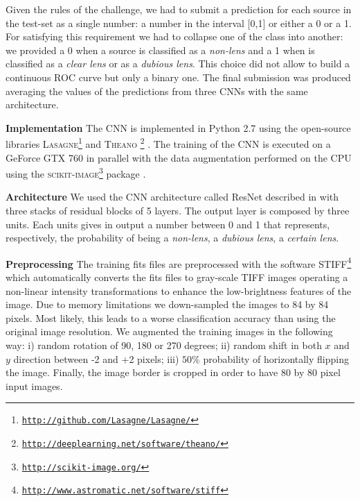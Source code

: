\documentclass{aa}
\begin{document}
Given the rules of the challenge, we had to submit a prediction for each source in the test-set as a single number: a number in the interval [0,1] or either a 0 or a 1. For satisfying this requirement we had to collapse one of the class into another: we provided a 0 when a source is classified as a \textit{non-lens} and a 1 when is classified as a \textit{clear lens} or as a \textit{dubious lens}. This choice did not allow to build a continuous ROC curve but only a binary one.
The final submission was produced averaging the values of the predictions from three CNNs with the same architecture.

{\bf Implementation}
The CNN is implemented in Python 2.7 using the open-source libraries \textsc{Lasagne}\footnote{\href{http://github.com/Lasagne/Lasagne/}{\tt http://github.com/Lasagne/Lasagne/}} 
and \textsc{Theano}
\footnote{\href{http://deeplearning.net/software/theano/}{\tt http://deeplearning.net/software/theano/}} \citep{theano}.  
The training of the CNN is executed on a GeForce GTX 760 in parallel with the data augmentation performed on the CPU using the \textsc{scikit-image}\footnote{\href{http://scikit-image.org/}{\tt http://scikit-image.org/}} package \citep{van2014scikit}. 

{\bf Architecture}
We used the CNN architecture called ResNet described in \citep{he2015deep} with three stacks of residual blocks of 5 layers. 
The output layer is composed by three units. Each units gives in output a number between 0 and 1 that represents, respectively, the probability of being a \textit{non-lens}, a \textit{dubious lens}, a \textit{certain lens}.

{\bf Preprocessing}
The training fits files are preprocessed with the software \textsc{STIFF}\footnote{\href{http://www.astromatic.net/software/stiff}{\tt http://www.astromatic.net/software/stiff}} which automatically converts the fits files to gray-scale TIFF images operating a non-linear intensity transformations to enhance the low-brightness features of the image.   
Due to memory limitations we down-sampled the images to 84 by 84 pixels. Most likely, this leads to a worse classification accuracy than using the original image resolution.
We augmented the training images in the following way: i) random rotation of 90, 180 or 270 degrees; ii) random shift in both $x$ and $y$ direction between -2 and +2 pixels; iii) $50\%$ probability of horizontally flipping the image. 
Finally, the image border is cropped in order to have 80 by 80 pixel input images.
\end{document}
